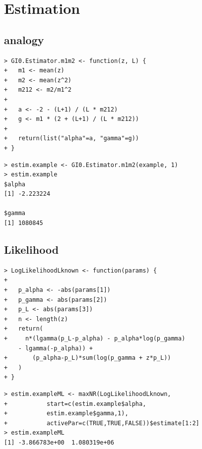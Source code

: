 \documentclass{article}
\begin{document}
\section{Estimation}
\subsection{analogy}
\begin{lstlisting}[frame=tb]
> GI0.Estimator.m1m2 <- function(z, L) {
+   m1 <- mean(z)
+   m2 <- mean(z^2)
+   m212 <- m2/m1^2
+   
+   a <- -2 - (L+1) / (L * m212)
+   g <- m1 * (2 + (L+1) / (L * m212))
+   
+   return(list("alpha"=a, "gamma"=g))
+ }
\end{lstlisting}
\begin{lstlisting}[frame=tb]
> estim.example <- GI0.Estimator.m1m2(example, 1)
> estim.example
$alpha
[1] -2.223224

$gamma
[1] 1080845
\end{lstlisting}
\subsection{Likelihood}
\begin{lstlisting}[frame=tb]
> LogLikelihoodLknown <- function(params) {
+   
+   p_alpha <- -abs(params[1])
+   p_gamma <- abs(params[2])
+   p_L <- abs(params[3])
+   n <- length(z)
+   return(
+     n*(lgamma(p_L-p_alpha) - p_alpha*log(p_gamma) 
	- lgamma(-p_alpha)) + 
+       (p_alpha-p_L)*sum(log(p_gamma + z*p_L)) 
+   )
+ }
\end{lstlisting}
\begin{lstlisting}[frame=tb]
> estim.exampleML <- maxNR(LogLikelihoodLknown, 
+			start=c(estim.example$alpha, 
+			estim.example$gamma,1), 
+			activePar=c(TRUE,TRUE,FALSE))$estimate[1:2]
> estim.exampleML
[1] -3.866783e+00  1.080319e+06
\end{lstlisting}
\end{document}
